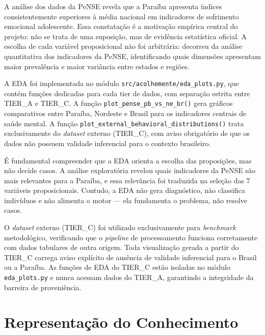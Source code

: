 \documentclass[
    12pt,
    openright,
    oneside,
    a4paper,
    english,
    brazil
]{abntex2}
\begin{document}
A an\'alise dos dados da PeNSE revela que a Para\'iba apresenta \'indices consistentemente superiores \`a m\'edia nacional em indicadores de sofrimento emocional adolescente. Essa constata\c{c}\~ao \'e a motiva\c{c}\~ao emp\'irica central do projeto: n\~ao se trata de uma suposi\c{c}\~ao, mas de evid\^encia estat\'istica oficial. A escolha de cada vari\'avel proposicional n\~ao foi arbitr\'aria: decorreu da an\'alise quantitativa dos indicadores da PeNSE, identificando quais dimens\~oes apresentam maior preval\^encia e maior vari\^ancia entre estados e regi\~oes.

A EDA foi implementada no m\'odulo \texttt{src/acolhemente/eda\_plots.py}, que cont\'em fun\c{c}\~oes dedicadas para cada tier de dados, com separa\c{c}\~ao estrita entre TIER\_A e TIER\_C. A fun\c{c}\~ao \texttt{plot\_pense\_pb\_vs\_ne\_br()} gera gr\'aficos comparativos entre Para\'iba, Nordeste e Brasil para os indicadores centrais de sa\'ude mental. A fun\c{c}\~ao \texttt{plot\_external\_behavioral\_distributions()} trata exclusivamente do \textit{dataset} externo (TIER\_C), com aviso obrigat\'orio de que os dados n\~ao possuem validade inferencial para o contexto brasileiro.

\'E fundamental compreender que a EDA orienta a escolha das proposi\c{c}\~oes, mas n\~ao decide casos. A an\'alise explorat\'oria revelou quais indicadores da PeNSE s\~ao mais relevantes para a Para\'iba, e essa relev\^ancia foi traduzida na sele\c{c}\~ao das 7 vari\'aveis proposicionais. Contudo, a EDA n\~ao gera diagn\'ostico, n\~ao classifica indiv\'iduos e n\~ao alimenta o motor --- ela fundamenta o problema, n\~ao resolve casos.

O \textit{dataset} externo (TIER\_C) foi utilizado exclusivamente para \textit{benchmark} metodol\'ogico, verificando que o \textit{pipeline} de processamento funciona corretamente com dados tabulares de outra origem. Toda visualiza\c{c}\~ao gerada a partir do TIER\_C carrega aviso expl\'icito de aus\^encia de validade inferencial para o Brasil ou a Para\'iba. As fun\c{c}\~oes de EDA do TIER\_C est\~ao isoladas no m\'odulo \texttt{eda\_plots.py} e nunca acessam dados do TIER\_A, garantindo a integridade da barreira de proveni\^encia.

\chapter{Representa\c{c}\~ao do Conhecimento}
\end{document}

